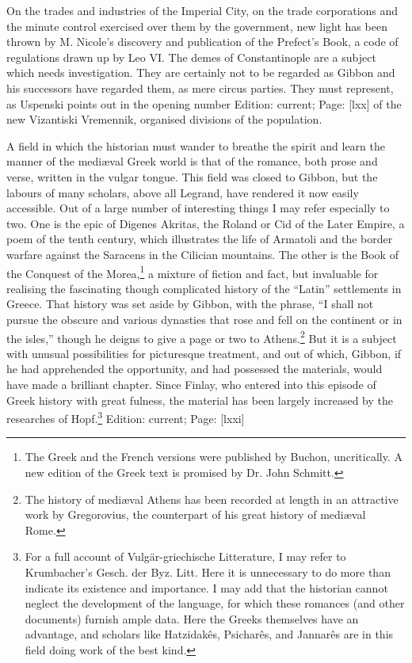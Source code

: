 On the trades and industries of the Imperial City, on the trade corporations and the minute control exercised over them by the government, new light has been thrown by M. Nicole\texthebrew{}’s discovery and publication of the Prefect\texthebrew{}’s Book, a code of regulations drawn up by Leo VI. The demes of Constantinople are a subject which needs investigation. They are certainly not to be regarded as Gibbon and his successors have regarded them, as mere circus parties. They must represent, as Uspenski points out in the opening number Edition: current; Page: [lxx] of the new Vizantiski Vremennik, organised divisions of the population.

A field in which the historian must wander to breathe the spirit and learn the manner of the mediæval Greek world is that of the romance, both prose and verse, written in the vulgar tongue. This field was closed to Gibbon, but the labours of many scholars, above all Legrand, have rendered it now easily accessible. Out of a large number of interesting things I may refer especially to two. One is the epic of Digenes Akritas, the Roland or Cid of the Later Empire, a poem of the tenth century, which illustrates the life of Armatoli and the border warfare against the Saracens in the Cilician mountains. The other is the Book of the Conquest of the Morea,\footnote{The Greek and the French versions were published by Buchon, uncritically. A new edition of the Greek text is promised by Dr. John Schmitt.} a mixture of fiction and fact, but invaluable for realising the fascinating though complicated history of the \texthebrew{“}Latin\texthebrew{}” settlements in Greece. That history was set aside by Gibbon, with the phrase, \texthebrew{“}I shall not pursue the obscure and various dynasties that rose and fell on the continent or in the isles,\texthebrew{}” though he deigns to give a page or two to Athens.\footnote{The history of mediæval Athens has been recorded at length in an attractive work by Gregorovius, the counterpart of his great history of mediæval Rome.} But it is a subject with unusual possibilities for picturesque treatment, and out of which, Gibbon, if he had apprehended the opportunity, and had possessed the materials, would have made a brilliant chapter. Since Finlay, who entered into this episode of Greek history with great fulness, the material has been largely increased by the researches of Hopf.\footnote{For a full account of Vulgär-griechische Litterature, I may refer to Krumbacher\texthebrew{}’s Gesch. der Byz. Litt. Here it is unnecessary to do more than indicate its existence and importance. I may add that the historian cannot neglect the development of the language, for which these romances (and other documents) furnish ample data. Here the Greeks themselves have an advantage, and scholars like Hatzidakês, Psicharês, and Jannarês are in this field doing work of the best kind.}
Edition: current; Page: [lxxi]

